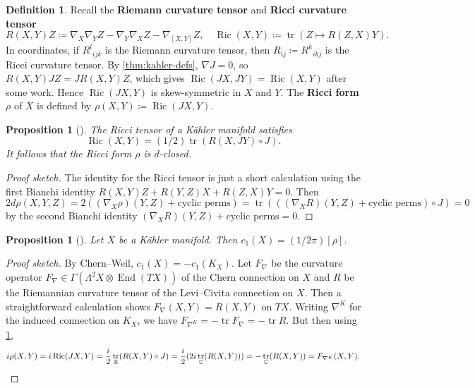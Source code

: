\documentclass{report}
\theoremstyle{plain}
\newtheorem{proposition}[theorem]{Proposition}
\theoremstyle{definition}
\newtheorem{definition}[theorem]{Definition}
\theoremstyle{remark}
\newcommand{\bC}{\mathbb{C}}
\newcommand{\bR}{\mathbb{R}}
\DeclareMathOperator{\End}{End}
\DeclareMathOperator{\tr}{tr}
\DeclareMathOperator{\Ric}{Ric}
\begin{document}
\begin{definition}
  Recall the {\bf Riemann curvature tensor} and {\bf Ricci curvature
    tensor}
  \[ R(X,Y)Z \coloneqq \nabla_X\nabla_YZ - \nabla_Y\nabla_XZ - \nabla_{[X,Y]}Z, \quad \Ric(X,Y) \coloneqq \tr(Z \mapsto R(Z,X)Y). \]
  In coordinates, if ${R^l}_{ijk}$ is the Riemann curvature tensor,
  then $R_{ij}\coloneqq {R^k}_{ikj}$ is the Ricci curvature tensor. By
  \ref{thm:kahler-defs}, $\nabla J = 0$, so $R(X,Y)JZ = JR(X,Y)Z$,
  which gives $\Ric(JX, JY) = \Ric(X, Y)$ after some work. Hence
  $\Ric(JX, Y)$ is skew-symmetric in $X$ and $Y$. The {\bf Ricci form}
  $\rho$ of $X$ is defined by $\rho(X, Y)\coloneqq \Ric(JX, Y)$.
\end{definition}

\begin{proposition}[{\cite[Proposition 12.2]{Moroianu2007}}] \label{thm:ricci-form-closed}
  The Ricci tensor of a K\"ahler manifold satisfies
  \[ \Ric(X, Y) = (1/2)\tr(R(X, JY) \circ J). \]
  It follows that the Ricci form $\rho$ is $d$-closed.
\end{proposition}

\begin{proof}[Proof sketch]
  The identity for the Ricci tensor is just a short calculation using
  the first Bianchi identity $R(X,Y)Z + R(Y,Z)X + R(Z,X)Y = 0$. Then
  \[ 2d\rho(X, Y, Z) = 2((\nabla_X \rho)(Y, Z) + \text{cyclic perms}) = \tr(((\nabla_X R)(Y, Z) + \text{cyclic perms}) \circ J) = 0 \]
  by the second Bianchi identity $(\nabla_X R)(Y, Z) + \text{cyclic
    perms} = 0$.
\end{proof}

\begin{proposition}[{\cite[Proposition 17.4]{Moroianu2007}}] \label{thm:chern-curvature-is-ricci}
  Let $X$ be a K\"ahler manifold. Then $c_1(X) = (1/2\pi)[\rho]$.
\end{proposition}

\begin{proof}[Proof sketch]
  By Chern--Weil, $c_1(X) = -c_1(K_X)$. Let $F_\nabla$ be the
  curvature operator $F_\nabla \in \Gamma(\Lambda^2 X
  \otimes \End(TX))$ of the Chern connection on $X$ and $R$ be the
  Riemannian curvature tensor of the Levi--Civita connection on $X$.
  Then a straightforward calculation shows $F_\nabla(X,Y) = R(X,Y)$ on
  $TX$. Writing $\nabla^K$ for the induced connection on $K_X$, we
  have $F_{\nabla^K} = -\tr F_\nabla = -\tr R$. But then using
  \ref{thm:ricci-form-closed},
  \[ i\rho(X, Y) = i\Ric(JX, Y) = \frac{i}{2} \tr_{\bR}(R(X, Y) \circ J) = \frac{i}{2}(2i \tr_{\bC}(R(X, Y))) = -\tr_{\bC}(R(X, Y)) = F_{\nabla^K}(X, Y). \qedhere \]
\end{proof}
\end{document}
